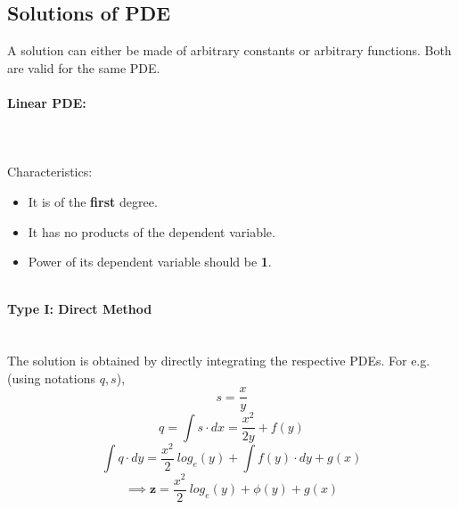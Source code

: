 \documentclass{article}
\newcommand{\para}[1]{\paragraph{#1}\mbox{}\\}
\begin{document}
{\subsection{\LARGE Solutions of PDE}
A solution can either be made of arbitrary constants or arbitrary functions. Both are valid for the same PDE.
\newline
\begin{center}
\end{center}
\newpage
\para{\LARGE Linear PDE:}
\\
Characteristics:
\begin{itemize}
\item It is of the \textbf{first} degree.
\item It has no products of the dependent variable.
\item Power of its dependent variable should be \textbf{1}.
\end{itemize}
$\ $
\para{\Large Type I: Direct Method}
The solution is obtained by directly integrating the respective PDEs. For e.g. (using notations $q,s$),
\\
{\LARGE $$s=\frac{x}y$$
$$q=\int s\cdot dx=\frac{x^2}{2y}+f(y)$$
$$\int q\cdot dy=\frac{x^2}2\ log_e(y)+\int f(y)\cdot dy+g(x)$$
$$\implies\mathbf{z}=\frac{x^2}2\ log_e(y)+\phi(y)+g(x)$$}
\newpage
}
\end{document}
